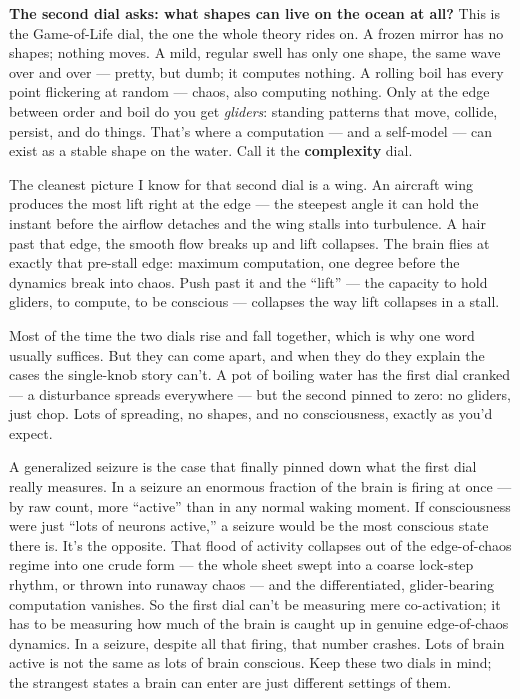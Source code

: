 \documentclass[11pt, twoside, openright]{book}
\begin{document}
\textbf{The second dial asks: what shapes can live on the ocean at all?} This is the Game-of-Life dial, the one the whole theory rides on. A frozen mirror has no shapes; nothing moves. A mild, regular swell has only one shape, the same wave over and over --- pretty, but dumb; it computes nothing. A rolling boil has every point flickering at random --- chaos, also computing nothing. Only at the edge between order and boil do you get \textit{gliders}: standing patterns that move, collide, persist, and do things. That's where a computation --- and a self-model --- can exist as a stable shape on the water. Call it the \textbf{complexity} dial.

The cleanest picture I know for that second dial is a wing. An aircraft wing produces the most lift right at the edge --- the steepest angle it can hold the instant before the airflow detaches and the wing stalls into turbulence. A hair past that edge, the smooth flow breaks up and lift collapses. The brain flies at exactly that pre-stall edge: maximum computation, one degree before the dynamics break into chaos. Push past it and the ``lift'' --- the capacity to hold gliders, to compute, to be conscious --- collapses the way lift collapses in a stall.

Most of the time the two dials rise and fall together, which is why one word usually suffices. But they can come apart, and when they do they explain the cases the single-knob story can't. A pot of boiling water has the first dial cranked --- a disturbance spreads everywhere --- but the second pinned to zero: no gliders, just chop. Lots of spreading, no shapes, and no consciousness, exactly as you'd expect.

A generalized seizure is the case that finally pinned down what the first dial really measures. In a seizure an enormous fraction of the brain is firing at once --- by raw count, more ``active'' than in any normal waking moment. If consciousness were just ``lots of neurons active,'' a seizure would be the most conscious state there is. It's the opposite. That flood of activity collapses out of the edge-of-chaos regime into one crude form --- the whole sheet swept into a coarse lock-step rhythm, or thrown into runaway chaos --- and the differentiated, glider-bearing computation vanishes. So the first dial can't be measuring mere co-activation; it has to be measuring how much of the brain is caught up in genuine edge-of-chaos dynamics. In a seizure, despite all that firing, that number crashes. Lots of brain active is not the same as lots of brain conscious. Keep these two dials in mind; the strangest states a brain can enter are just different settings of them.
\end{document}
